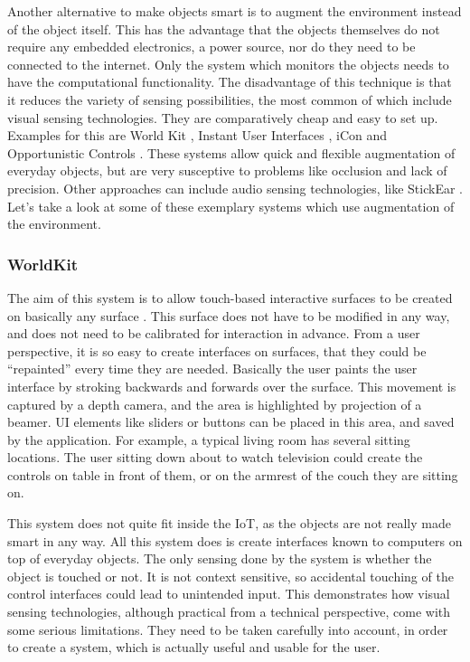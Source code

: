 Another alternative to make objects smart is to augment the environment instead of the object itself. 
This has the advantage that the objects themselves do not require any embedded electronics, a power source, nor do they need to be connected to the internet. 
Only the system which monitors the objects needs to have the computational functionality. 
The disadvantage of this technique is that it reduces the variety of sensing possibilities, the most common of which include visual sensing technologies. 
They are comparatively cheap and easy to set up. 
Examples for this are World Kit \cite{xiao13}, Instant User Interfaces \cite{corsten13}, iCon \cite{cheng10} and Opportunistic Controls \cite{henderson08}. 
These systems allow quick and flexible augmentation of everyday objects, but are very susceptive to problems like occlusion and lack of precision.
Other approaches can include audio sensing technologies, like StickEar \cite{yeo13}. Let's take a look at some of these exemplary systems which use augmentation of the environment.

\subsubsection{WorldKit}
\label{sec:worldKit}
The aim of this system is to allow touch-based interactive surfaces to be created on basically any surface \cite{xiao13}. 
This surface does not have to be modified in any way, and does not need to be calibrated for interaction in advance. 
From a user perspective, it is so easy to create interfaces on surfaces, that they could be ``repainted'' every time they are needed. 
Basically the user paints the user interface by stroking backwards and forwards over the surface. 
This movement is captured by a depth camera, and the area is highlighted by projection of a beamer. 
UI elements like sliders or buttons can be placed in this area, and saved by the application. 
For example, a typical living room has several sitting locations. 
The user sitting down about to watch television could create the controls on table in front of them, or on the armrest of the couch they are sitting on.

This system does not quite fit inside the IoT, as the objects are not really made smart in any way. 
All this system does is create interfaces known to computers on top of everyday objects. 
The only sensing done by the system is whether the object is touched or not. 
It is not context sensitive, so accidental touching of the control interfaces could lead to unintended input. 
This demonstrates how visual sensing technologies, although practical from a technical perspective, come with some serious limitations. 
They need to be taken carefully into account, in order to create a system, which is actually useful and usable for the user.

